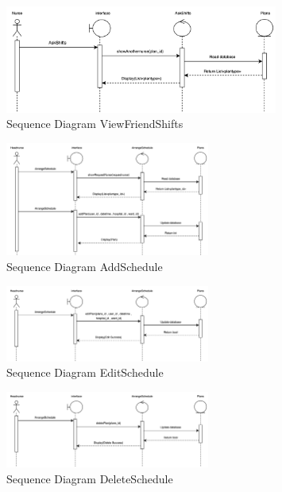     \begin{figure}[h]
    \centering
    \includegraphics[width=0.8\textwidth]{Sequence 2.4.png}
    \caption{Sequence Diagram ViewFriendShifts}
    \end{figure}




    \begin{figure}[h]
    \centering
    \includegraphics[width=0.6\textwidth]{Sequence 3.1.png}
    \caption{Sequence Diagram AddSchedule}
    \end{figure}

    \begin{figure}[h]
    \centering
    \includegraphics[width=0.6\textwidth]{Sequence 3.2.png}
    \caption{Sequence Diagram EditSchedule}
    \end{figure}

    \begin{figure}[h]
    \centering
    \includegraphics[width=0.6\textwidth]{Sequence 3.3.png}
    \caption{Sequence Diagram DeleteSchedule}
    \end{figure}

